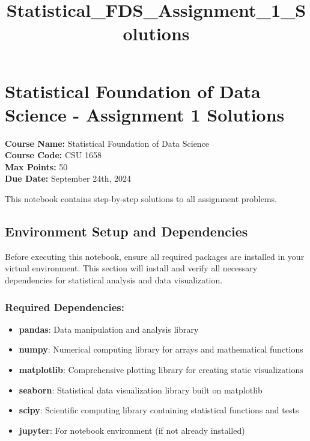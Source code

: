 \documentclass[11pt]{article}
\title{Statistical\_FDS\_Assignment\_1\_Solutions}
\providecommand{\tightlist}{%
      \setlength{\itemsep}{0pt}\setlength{\parskip}{0pt}}
\begin{document}
    \maketitle




    \section{Statistical Foundation of Data Science - Assignment 1
Solutions}\label{statistical-foundation-of-data-science---assignment-1-solutions}

\textbf{Course Name:} Statistical Foundation of Data Science\\
\textbf{Course Code:} CSU 1658\\
\textbf{Max Points:} 50\\
\textbf{Due Date:} September 24th, 2024

This notebook contains step-by-step solutions to all assignment
problems.

    \subsection{Environment Setup and
Dependencies}\label{environment-setup-and-dependencies}

Before executing this notebook, ensure all required packages are
installed in your virtual environment. This section will install and
verify all necessary dependencies for statistical analysis and data
visualization.

\subsubsection{Required Dependencies:}\label{required-dependencies}

\begin{itemize}
\tightlist
\item
  \textbf{pandas}: Data manipulation and analysis library
\item
  \textbf{numpy}: Numerical computing library for arrays and
  mathematical functions
\item
  \textbf{matplotlib}: Comprehensive plotting library for creating
  static visualizations
\item
  \textbf{seaborn}: Statistical data visualization library built on
  matplotlib
\item
  \textbf{scipy}: Scientific computing library containing statistical
  functions and tests
\item
  \textbf{jupyter}: For notebook environment (if not already installed)
\end{itemize}
\end{document}
